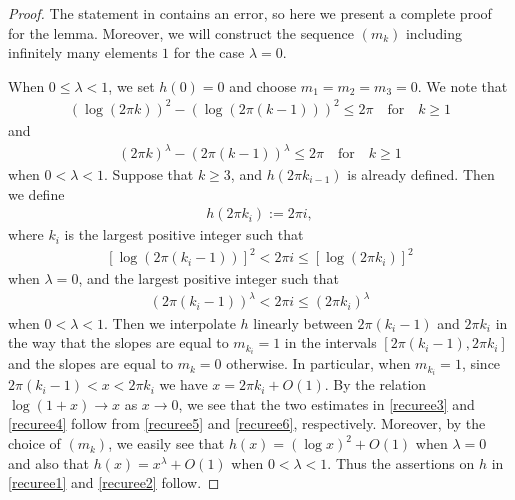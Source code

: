 \documentclass[12pt]{amsart}
\numberwithin{equation}{section}
\begin{document}
\begin{proof}
The statement in \cite[Lemma~2.2]{Zhang2024} contains an error, so here we present a complete proof for the lemma. Moreover, we will construct the sequence $(m_k)$ including infinitely many elements $1$ for the case $\lambda=0$.

When $0\leq \lambda < 1$, we set $h(0)=0$ and choose $m_1=m_2=m_3=0$. We note that
\begin{equation*}
\begin{split}
(\log(2\pi k))^2-(\log(2\pi(k-1)))^2 \leq 2\pi \quad \text{for} \quad k\geq 1
\end{split}
\end{equation*}
and
\begin{equation*}
\begin{split}
(2\pi k)^{\lambda}-(2\pi(k-1))^{\lambda} \leq 2\pi \quad \text{for} \quad k\geq 1
\end{split}
\end{equation*}
when $0<\lambda<1$. Suppose that $k\geq 3$, and $h(2\pi k_{i-1})$ is already defined. Then we define
\begin{equation}\label{recuree5-bef}
\begin{split}
h(2\pi k_{i}):=2\pi i,
\end{split}
\end{equation}
where $k_{i}$ is the largest positive integer such that
\begin{equation}\label{recuree5}
\begin{split}
[\log(2\pi(k_{i}-1))]^2<2\pi i\leq [\log(2\pi k_{i})]^2
\end{split}
\end{equation}
when $\lambda=0$, and the largest positive integer such that
\begin{equation}\label{recuree6}
\begin{split}
(2\pi(k_{i}-1))^{\lambda}<2\pi i\leq (2\pi k_{i})^{\lambda}
\end{split}
\end{equation}
when $0<\lambda<1$. Then we interpolate $h$ linearly between $2\pi (k_{i}-1)$ and $2\pi k_i$ in the way that the slopes are equal to $m_{k_i}=1$ in the intervals $[2\pi (k_i-1),2\pi k_i]$ and the slopes are equal to $m_{k}=0$ otherwise. In particular, when $m_{k_i}=1$, since $2\pi(k_i-1)<x<2\pi k_i$ we have $x=2\pi k_i+O(1)$. By the relation $\log(1+x)\to x$ as $x\to 0$, we see that the two estimates in \eqref{recuree3} and \eqref{recuree4} follow from \eqref{recuree5} and \eqref{recuree6}, respectively. Moreover, by the choice of $(m_k)$, we easily see that $h(x)=(\log x)^2+O(1)$ when $\lambda=0$ and also that $h(x)=x^{\lambda}+O(1)$ when $0<\lambda<1$. Thus the assertions on $h$ in \eqref{recuree1} and \eqref{recuree2} follow.

\end{proof}
\end{document}
